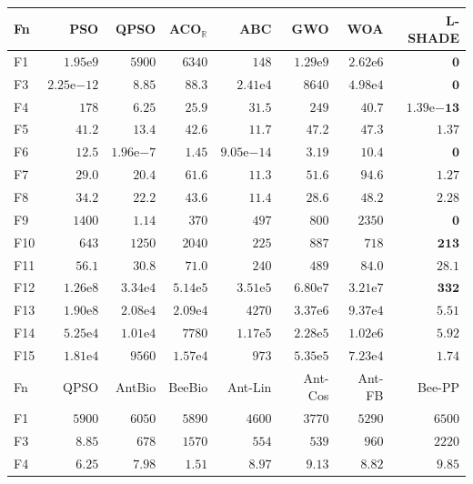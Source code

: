 \begin{tabular}{lrrrrrrr}
\toprule
Fn & PSO & QPSO & ACO$_\mathbb{R}$ & ABC & GWO & WOA & L-SHADE \\
\midrule
F1 & $1.95\mathrm{e}{9}$ & $5900$ & $6340$ & $148$ & $1.29\mathrm{e}{9}$ & $2.62\mathrm{e}{6}$ & $\mathbf{0}$ \\
F3 & $2.25\mathrm{e}{-12}$ & $8.85$ & $88.3$ & $2.41\mathrm{e}{4}$ & $8640$ & $4.98\mathrm{e}{4}$ & $\mathbf{0}$ \\
F4 & $178$ & $6.25$ & $25.9$ & $31.5$ & $249$ & $40.7$ & $\mathbf{1.39\mathrm{e}{-13}}$ \\
F5 & $41.2$ & $13.4$ & $42.6$ & $11.7$ & $47.2$ & $47.3$ & $\mathbf{1.37}$ \\
F6 & $12.5$ & $1.96\mathrm{e}{-7}$ & $1.45$ & $9.05\mathrm{e}{-14}$ & $3.19$ & $10.4$ & $\mathbf{0}$ \\
F7 & $29.0$ & $20.4$ & $61.6$ & $11.3$ & $51.6$ & $94.6$ & $\mathbf{1.27}$ \\
F8 & $34.2$ & $22.2$ & $43.6$ & $11.4$ & $28.6$ & $48.2$ & $\mathbf{2.28}$ \\
F9 & $1400$ & $1.14$ & $370$ & $497$ & $800$ & $2350$ & $\mathbf{0}$ \\
F10 & $643$ & $1250$ & $2040$ & $225$ & $887$ & $718$ & $\mathbf{213}$ \\
F11 & $56.1$ & $30.8$ & $71.0$ & $240$ & $489$ & $84.0$ & $\mathbf{28.1}$ \\
F12 & $1.26\mathrm{e}{8}$ & $3.34\mathrm{e}{4}$ & $5.14\mathrm{e}{5}$ & $3.51\mathrm{e}{5}$ & $6.80\mathrm{e}{7}$ & $3.21\mathrm{e}{7}$ & $\mathbf{332}$ \\
F13 & $1.90\mathrm{e}{8}$ & $2.08\mathrm{e}{4}$ & $2.09\mathrm{e}{4}$ & $4270$ & $3.37\mathrm{e}{6}$ & $9.37\mathrm{e}{4}$ & $\mathbf{5.51}$ \\
F14 & $5.25\mathrm{e}{4}$ & $1.01\mathrm{e}{4}$ & $7780$ & $1.17\mathrm{e}{5}$ & $2.28\mathrm{e}{5}$ & $1.02\mathrm{e}{6}$ & $\mathbf{5.92}$ \\
F15 & $1.81\mathrm{e}{4}$ & $9560$ & $1.57\mathrm{e}{4}$ & $973$ & $5.35\mathrm{e}{5}$ & $7.23\mathrm{e}{4}$ & $\mathbf{1.74}$ \\
\midrule
Fn & QPSO & AntBio & BeeBio & Ant-Lin & Ant-Cos & Ant-FB & Bee-PP \\
\midrule
F1 & $5900$ & $6050$ & $5890$ & $4600$ & $3770$ & $5290$ & $6500$ \\
F3 & $8.85$ & $678$ & $1570$ & $554$ & $539$ & $960$ & $2220$ \\
F4 & $6.25$ & $7.98$ & $1.51$ & $8.97$ & $9.13$ & $8.82$ & $9.85$ \\

\end{tabular}
